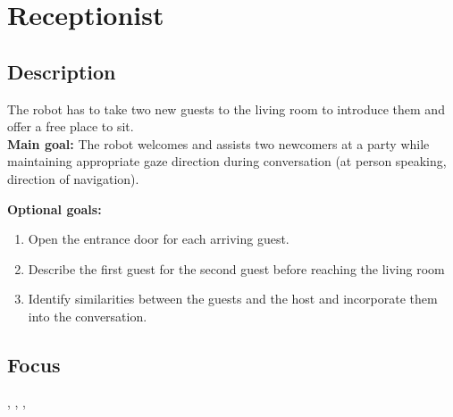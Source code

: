 \section{Receptionist}
\label{test:receptionist}
\subsection*{Description}
The robot has to take two new guests to the living room to introduce them and offer a free place to sit.\\
    
\textbf{Main goal:}
    The robot welcomes and assists two newcomers at a party while maintaining appropriate gaze direction during conversation (at person speaking, direction of navigation).

\textbf{Optional goals:}
\begin{enumerate}[nosep]
	\item Open the entrance door for each arriving guest.
	\item Describe the first guest for the second guest before reaching the living room
	\item Identify similarities between the guests and the host and incorporate them into the conversation.
\end{enumerate}

\subsection*{Focus}
\SysI{}, \HRI{}, \PerDet{}, \PerRec

